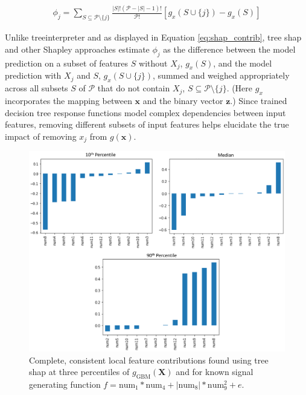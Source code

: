 \documentclass[11pt]{asaproc}
\begin{document}
\begin{equation}
\label{eq:shap_contrib}
\begin{aligned}
\phi_{j} = \sum_{S \subseteq \mathcal{P} \setminus \{j\}}\frac{|S|!(\mathcal{P} -|S| -1)!}{\mathcal{P}!}[g_x(S \cup \{j\}) - g_x(S)]
\end{aligned}
\end{equation}

\noindent Unlike treeinterpreter and as displayed in Equation \ref{eq:shap_contrib}, tree shap and other Shapley approaches estimate $\phi_j$ as the difference between the model prediction on a subset of features $S$ without $X_j$, $g_x(S)$, and the model prediction with $X_j$ and $S$, $g_x(S \cup \{j\})$, summed and weighed appropriately across all subsets $S$ of $\mathcal{P}$ that do not contain $X_j$, $S \subseteq \mathcal{P} \setminus \{j\}$. (Here $g_x$ incorporates the mapping between $\mathbf{x}$ and the binary vector $\mathbf{z}$.) Since trained decision tree response functions model complex dependencies between input features, removing different subsets of input features helps elucidate the true impact of removing $x_j$ from $g(\mathbf{x})$.

\begin{figure}[htb]
	\begin{center}
		\includegraphics[scale=0.6]{img/figure_6.eps}
		\caption{Complete, consistent local feature contributions found using tree shap at three percentiles of $g_{\text{GBM}}(\mathbf{X})$ and for known signal generating function $f = \text{num} _1 * \text{num}_4 + |\text{num}_8| * \text{num}_9^2 + e$.}
		\label{fig:shap}
	\end{center}
\end{figure}
\end{document}
